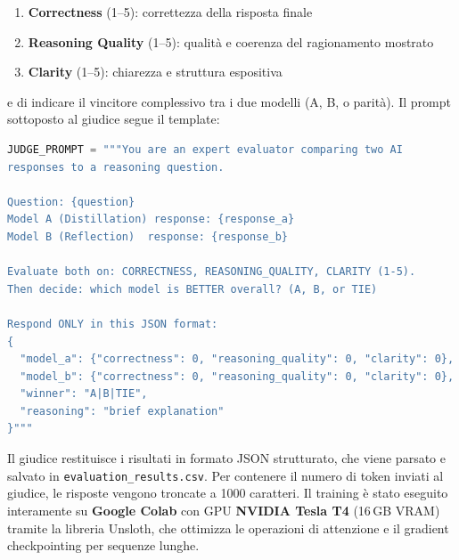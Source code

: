 \begin{enumerate}
  \item \textbf{Correctness} (1--5): correttezza della risposta finale
  \item \textbf{Reasoning Quality} (1--5): qualità e coerenza del
    ragionamento mostrato
  \item \textbf{Clarity} (1--5): chiarezza e struttura espositiva
\end{enumerate}

e di indicare il vincitore complessivo tra i due modelli (A, B, o
parità). Il prompt sottoposto al giudice segue il template:

\begin{lstlisting}[language=Python, caption={Template del prompt per il giudice LLM.}, float=tbp]
JUDGE_PROMPT = """You are an expert evaluator comparing two AI
responses to a reasoning question.

Question: {question}
Model A (Distillation) response: {response_a}
Model B (Reflection)  response: {response_b}

Evaluate both on: CORRECTNESS, REASONING_QUALITY, CLARITY (1-5).
Then decide: which model is BETTER overall? (A, B, or TIE)

Respond ONLY in this JSON format:
{
  "model_a": {"correctness": 0, "reasoning_quality": 0, "clarity": 0},
  "model_b": {"correctness": 0, "reasoning_quality": 0, "clarity": 0},
  "winner": "A|B|TIE",
  "reasoning": "brief explanation"
}"""
\end{lstlisting}

Il giudice restituisce i risultati in formato JSON strutturato,
che viene parsato e salvato in \texttt{evaluation\_results.csv}.
Per contenere il numero di token inviati al giudice, le risposte
vengono troncate a 1000 caratteri. Il training è stato eseguito
interamente su \textbf{Google Colab} con GPU \textbf{NVIDIA Tesla T4}
(16\,GB VRAM) tramite la libreria Unsloth, che ottimizza le operazioni
di attenzione e il gradient checkpointing per sequenze lunghe.
